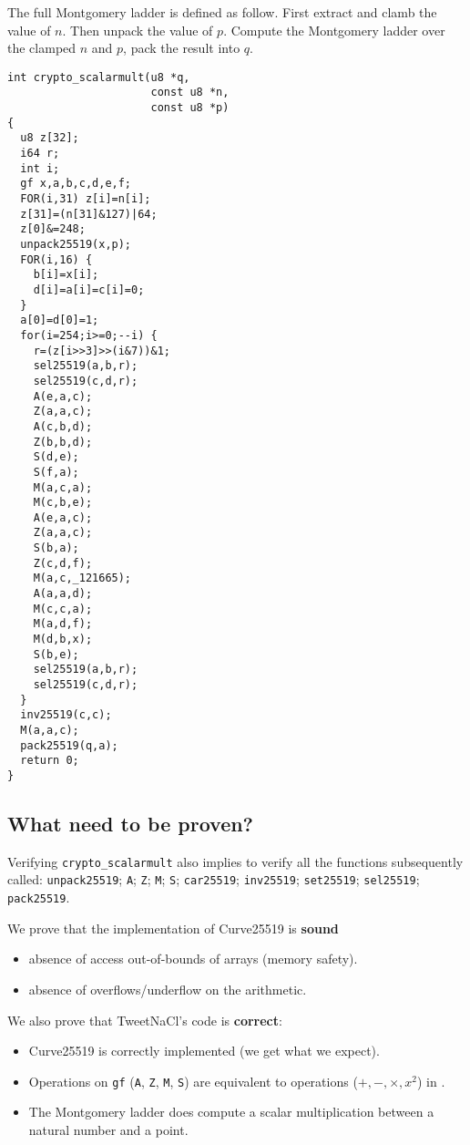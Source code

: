 The full Montgomery ladder is defined as follow.
First extract and clamb the value of $n$. Then unpack the value of $p$.
Compute the Montgomery ladder over the clamped $n$ and $p$, pack the result into $q$.
\begin{lstlisting}[language=Ctweetnacl]
int crypto_scalarmult(u8 *q,
                      const u8 *n,
                      const u8 *p)
{
  u8 z[32];
  i64 r;
  int i;
  gf x,a,b,c,d,e,f;
  FOR(i,31) z[i]=n[i];
  z[31]=(n[31]&127)|64;
  z[0]&=248;
  unpack25519(x,p);
  FOR(i,16) {
    b[i]=x[i];
    d[i]=a[i]=c[i]=0;
  }
  a[0]=d[0]=1;
  for(i=254;i>=0;--i) {
    r=(z[i>>3]>>(i&7))&1;
    sel25519(a,b,r);
    sel25519(c,d,r);
    A(e,a,c);
    Z(a,a,c);
    A(c,b,d);
    Z(b,b,d);
    S(d,e);
    S(f,a);
    M(a,c,a);
    M(c,b,e);
    A(e,a,c);
    Z(a,a,c);
    S(b,a);
    Z(c,d,f);
    M(a,c,_121665);
    A(a,a,d);
    M(c,c,a);
    M(a,d,f);
    M(d,b,x);
    S(b,e);
    sel25519(a,b,r);
    sel25519(c,d,r);
  }
  inv25519(c,c);
  M(a,a,c);
  pack25519(q,a);
  return 0;
}
\end{lstlisting}

\subsection{What need to be proven?}

Verifying \texttt{crypto\_scalarmult} also implies to verify all the functions
subsequently called: \texttt{unpack25519}; \texttt{A}; \texttt{Z}; \texttt{M};
\texttt{S}; \texttt{car25519}; \texttt{inv25519}; \texttt{set25519}; \texttt{sel25519};
\texttt{pack25519}.

We prove that the implementation of Curve25519 is \textbf{sound} \ie

\begin{itemize}
\item absence of access out-of-bounds of arrays (memory safety).
\item absence of overflows/underflow on the arithmetic.
\end{itemize}

\noindent
We also prove that TweetNaCl's code is \textbf{correct}:

\begin{itemize}
\item Curve25519 is correctly implemented (we get what we expect).
\item Operations on \texttt{gf} (\texttt{A}, \texttt{Z}, \texttt{M}, \texttt{S})
are equivalent to operations ($+,-,\times,x^2$) in \Zfield.
\item The Montgomery ladder does compute a scalar multiplication between a natural number and a point.
\end{itemize}

